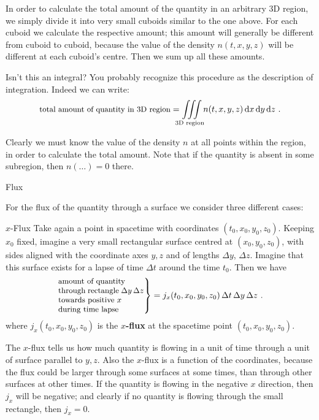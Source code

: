 \documentclass[a4paper,12pt,%
onecolumn,oneside,titlepage,%
british%
]{memoir}
\newcommand*{\di}{\mathrm{d}}%
\newcommand*{\incr}{\Delta}%
\renewcommand*{\|}[1][]{\nonscript\:#1\vert\nonscript\:\mathopen{}}
\newcommand*{\yto}{t_{0}}
\newcommand*{\yxo}{x_{0}}
\newcommand*{\yyo}{y_{0}}
\newcommand*{\yzo}{z_{0}}
\newcommand*{\Dt}{\incr t}
\newcommand*{\Dy}{\incr y}
\newcommand*{\Dz}{\incr z}
\begin{document}
In order to calculate the total amount of the quantity in an arbitrary 3D region, we simply divide it into very small cuboids similar to the one above. For each cuboid we calculate the respective amount; this amount will generally be different from cuboid to cuboid, because the value of the density $n(t,x,y,z)$ will be different at each cuboid's centre. Then we sum up all these amounts.

\begin{extra}{Isn't this an integral?}
  You probably recognize this procedure as the description of integration. Indeed we can write:
  \begin{equation}
    \label{eq:density_integral}
    \text{\small total amount of quantity in 3D region} = 
    \iiint\limits_{\mathclap{\text{3D region}}}n(t,x,y,z)\, \di x\, \di y\, \di z \ .
  \end{equation}
\end{extra}
Clearly we must know the value of the density $n$ at all points within the region, in order to calculate the total amount. Note that if the quantity is absent in some subregion, then $n(\dotso)=0$ there.

\medskip


\begin{warning}
  Flux
\end{warning}

For the flux of the quantity through a surface we consider three different cases:
\begin{definition}{$x$-Flux}
  Take again a point in spacetime with coordinates $(\yto,\yxo,\yyo,\yzo)$. Keeping $\yxo$ fixed, imagine a very small rectangular surface centred at $(\yxo,\yyo,\yzo)$, with sides aligned with the coordinate axes $y,z$ and of lengths $\Dy$, $\Dz$. Imagine that this surface exists for a lapse of time $\Dt$ around the time $\yto$. Then we have
  \begin{equation}
    \label{eq:xflux_expl}
    \left.\parbox[c]{10em}{\small amount of quantity\\ through rectangle $\Dy\,\Dz$\\ towards positive $x$\\during time lapse }\right\} = 
    j_{x}(\yto,\yxo,\yyo,\yzo)\, \Dt\, \Dy\, \Dz \ .
  \end{equation}
  where $j_{x}(\yto,\yxo,\yyo,\yzo)$ is the \textbf{$x$-flux} at the spacetime point $(\yto,\yxo,\yyo,\yzo)$.
\end{definition}
The $x$-flux tells us how much quantity is flowing in a unit of time through a unit of surface parallel to $y,z$. Also the $x$-flux is a function of the coordinates, because the flux could be larger through some surfaces at some times, than through other surfaces at other times. If the quantity is flowing in the negative $x$ direction, then $j_{x}$ will be negative; and clearly if no quantity is flowing through the small rectangle, then $j_{x}=0$.
\end{document}
